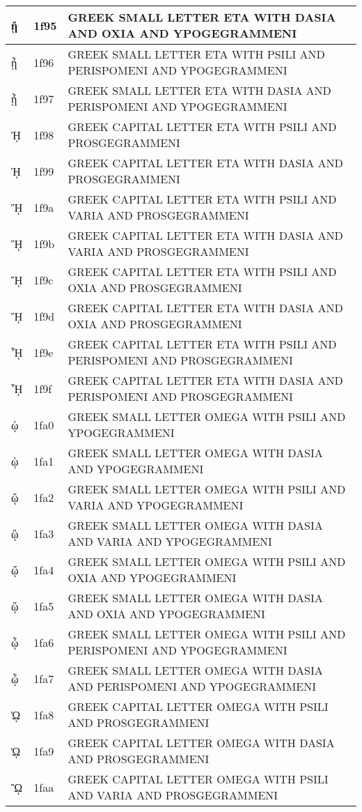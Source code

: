 \documentclass[12pt,letterpaper,openany]{book}
\begin{document}
\begin{center}
\begin{supertabular}{|m{0.25in}|m{0.5in}|m{4in}|}
ᾕ & 1f95 & GREEK SMALL LETTER ETA WITH DASIA AND OXIA AND YPOGEGRAMMENI\\\hline
ᾖ & 1f96 & GREEK SMALL LETTER ETA WITH PSILI AND PERISPOMENI AND YPOGEGRAMMENI\\\hline
ᾗ & 1f97 & GREEK SMALL LETTER ETA WITH DASIA AND PERISPOMENI AND YPOGEGRAMMENI\\\hline
ᾘ & 1f98 & GREEK CAPITAL LETTER ETA WITH PSILI AND PROSGEGRAMMENI\\\hline
ᾙ & 1f99 & GREEK CAPITAL LETTER ETA WITH DASIA AND PROSGEGRAMMENI\\\hline
ᾚ & 1f9a & GREEK CAPITAL LETTER ETA WITH PSILI AND VARIA AND PROSGEGRAMMENI\\\hline
ᾛ & 1f9b & GREEK CAPITAL LETTER ETA WITH DASIA AND VARIA AND PROSGEGRAMMENI\\\hline
ᾜ & 1f9c & GREEK CAPITAL LETTER ETA WITH PSILI AND OXIA AND PROSGEGRAMMENI\\\hline
ᾝ & 1f9d & GREEK CAPITAL LETTER ETA WITH DASIA AND OXIA AND PROSGEGRAMMENI\\\hline
ᾞ & 1f9e & GREEK CAPITAL LETTER ETA WITH PSILI AND PERISPOMENI AND PROSGEGRAMMENI\\\hline
ᾟ & 1f9f & GREEK CAPITAL LETTER ETA WITH DASIA AND PERISPOMENI AND PROSGEGRAMMENI\\\hline
ᾠ & 1fa0 & GREEK SMALL LETTER OMEGA WITH PSILI AND YPOGEGRAMMENI\\\hline
ᾡ & 1fa1 & GREEK SMALL LETTER OMEGA WITH DASIA AND YPOGEGRAMMENI\\\hline
ᾢ & 1fa2 & GREEK SMALL LETTER OMEGA WITH PSILI AND VARIA AND YPOGEGRAMMENI\\\hline
ᾣ & 1fa3 & GREEK SMALL LETTER OMEGA WITH DASIA AND VARIA AND YPOGEGRAMMENI\\\hline
ᾤ & 1fa4 & GREEK SMALL LETTER OMEGA WITH PSILI AND OXIA AND YPOGEGRAMMENI\\\hline
ᾥ & 1fa5 & GREEK SMALL LETTER OMEGA WITH DASIA AND OXIA AND YPOGEGRAMMENI\\\hline
ᾦ & 1fa6 & GREEK SMALL LETTER OMEGA WITH PSILI AND PERISPOMENI AND YPOGEGRAMMENI\\\hline
ᾧ & 1fa7 & GREEK SMALL LETTER OMEGA WITH DASIA AND PERISPOMENI AND YPOGEGRAMMENI\\\hline
ᾨ & 1fa8 & GREEK CAPITAL LETTER OMEGA WITH PSILI AND PROSGEGRAMMENI\\\hline
ᾩ & 1fa9 & GREEK CAPITAL LETTER OMEGA WITH DASIA AND PROSGEGRAMMENI\\\hline
ᾪ & 1faa & GREEK CAPITAL LETTER OMEGA WITH PSILI AND VARIA AND PROSGEGRAMMENI\\\hline

\end{supertabular}
\end{center}
\end{document}
